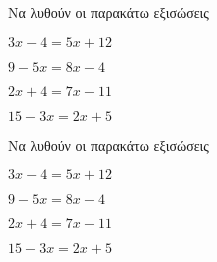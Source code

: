 Να λυθούν οι παρακάτω εξισώσεις
\begin{alist}
\item $ 3x-4=5x+12 $
\item $ 9-5x=8x-4 $
\item $ 2x+4=7x-11 $
\item $ 15-3x=2x+5 $
\end{alist}
Να λυθούν οι παρακάτω εξισώσεις
\begin{alist}
\item $ 3x-4=5x+12 $
\item $ 9-5x=8x-4 $
\item $ 2x+4=7x-11 $
\item $ 15-3x=2x+5 $
\end{alist}
